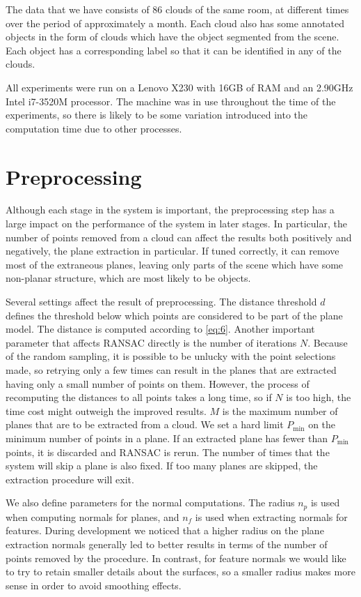 \documentclass[11pt,a4paper]{kth-mag}
\begin{document}
The data that we have consists of 86 clouds of the same room, at different times
over the period of approximately a month. Each cloud also has some annotated
objects in the form of clouds which have the object segmented from the scene.
Each object has a corresponding label so that it can be identified in any of the
clouds.

All experiments were run on a Lenovo X230 with 16GB of RAM and an 2.90GHz Intel
i7-3520M processor. The machine was in use throughout the time of the
experiments, so there is likely to be some variation introduced into the
computation time due to other processes.

\section{Preprocessing}
Although each stage in the system is important, the preprocessing step has a
large impact on the performance of the system in later stages. In particular,
the number of points removed from a cloud can affect the results both positively
and negatively, the plane extraction in particular. If tuned correctly, it can
remove most of the extraneous planes, leaving only parts of the scene which have
some non-planar structure, which are most likely to be objects. 

Several settings affect the result of preprocessing. The distance threshold $d$
defines the threshold below which points are considered to be part of the plane
model. The distance is computed according to \eqref{eq:6}. Another
important parameter that affects RANSAC directly is the number of iterations
$N$. Because of the random sampling, it is possible to be unlucky with the point
selections made, so retrying only a few times can result in the planes that are
extracted having only a small number of points on them. However, the process of
recomputing the distances to all points takes a long time, so if $N$ is too
high, the time cost might outweigh the improved results. $M$ is the maximum
number of planes that are to be extracted from a cloud. We set a hard limit
$P_{\min}$ on the minimum number of points in a plane. If an extracted plane has
fewer than $P_{\min}$ points, it is discarded and RANSAC is rerun. The number of
times that the system will skip a plane is also fixed. If too many planes are
skipped, the extraction procedure will exit.

We also define parameters for the normal computations. The radius $n_p$ is used
when computing normals for planes, and $n_f$ is used when extracting normals for
features. During development we noticed that a higher radius on the plane
extraction normals generally led to better results in terms of the number of
points removed by the procedure. In contrast, for feature normals we would like
to try to retain smaller details about the surfaces, so a smaller radius makes
more sense in order to avoid smoothing effects.
\end{document}
